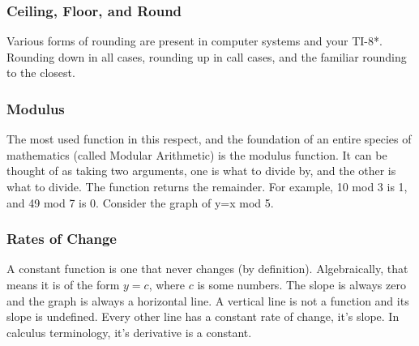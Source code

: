 \subsubsection{Ceiling, Floor, and Round}
Various forms of rounding are present in computer systems and your TI-8*.  Rounding down
in all cases, rounding up in call cases, and the familiar rounding to the closest.

\subsubsection{Modulus}
The most used function in this respect, and the foundation of an entire species of mathematics
(called Modular Arithmetic) is the modulus function.  It can be thought of as taking two arguments,
one is what to divide by, and the other is what to divide.  The function returns the remainder.  For
example, 10 mod 3 is 1, and 49 mod 7 is 0.  Consider the graph of y=x mod 5.

\subsubsection{Rates of Change}
A constant function is one that never changes (by definition).  
Algebraically, that means it is
of the form $y=c$, where $c$ is some numbers.  The slope is always zero and the graph
is always a horizontal line.  A vertical line is not a function and its slope is undefined.  Every
other line has a constant rate of change, it's slope.  In calculus terminology,
it's derivative is a constant.






